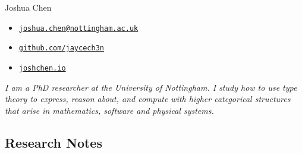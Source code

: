 \documentclass[12pt,a4paper]{article}
\author{}
\date{}
\providecommand{\tightlist}{%
  \setlength{\itemsep}{0pt}\setlength{\parskip}{0pt}}
\begin{document}
\thispagestyle{fancy}

{\sc\huge Joshua Chen}
\vspace{1.5ex}
\begin{itemize}
\tightlist
\item[\small\faPaperPlane] \href{mailto:joshua.chen@nottingham.ac.uk}{\nolinkurl{joshua.chen@nottingham.ac.uk}}
\item[\small\faGithub] \href{https://github.com/jaycech3n}{\nolinkurl{github.com/jaycech3n}}
\item[\small\faGlobeEurope] \href{https://joshchen.io}{\nolinkurl{joshchen.io}}
\end{itemize}
\vspace{1.5ex}
\textit{I am a PhD researcher at the University of Nottingham.
I study how to use type theory to express, reason about, and compute with higher categorical structures that arise in mathematics, software and physical systems.}

\subsection{Research Notes}
\end{document}
